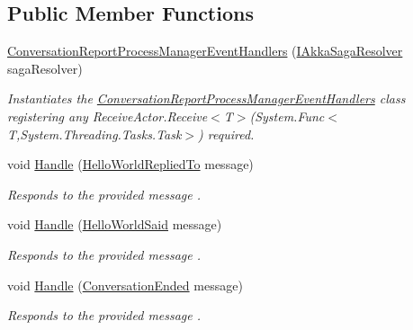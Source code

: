 \subsection*{Public Member Functions}
\begin{DoxyCompactItemize}
\item 
\hyperlink{classCqrs_1_1Akka_1_1Tests_1_1Unit_1_1Sagas_1_1ConversationReportProcessManagerEventHandlers_a0b35d652189d6194ff5893ff114293e0_a0b35d652189d6194ff5893ff114293e0}{Conversation\+Report\+Process\+Manager\+Event\+Handlers} (\hyperlink{interfaceCqrs_1_1Akka_1_1Domain_1_1IAkkaSagaResolver}{I\+Akka\+Saga\+Resolver} saga\+Resolver)
\begin{DoxyCompactList}\small\item\em Instantiates the \hyperlink{classCqrs_1_1Akka_1_1Tests_1_1Unit_1_1Sagas_1_1ConversationReportProcessManagerEventHandlers}{Conversation\+Report\+Process\+Manager\+Event\+Handlers} class registering any Receive\+Actor.\+Receive$<$\+T$>$(\+System.\+Func$<$\+T,\+System.\+Threading.\+Tasks.\+Task$>$) required. \end{DoxyCompactList}\item 
void \hyperlink{classCqrs_1_1Akka_1_1Tests_1_1Unit_1_1Sagas_1_1ConversationReportProcessManagerEventHandlers_a0a40389673be0983b56d65eeaa54bff9_a0a40389673be0983b56d65eeaa54bff9}{Handle} (\hyperlink{classCqrs_1_1Akka_1_1Tests_1_1Unit_1_1Events_1_1HelloWorldRepliedTo}{Hello\+World\+Replied\+To} message)
\begin{DoxyCompactList}\small\item\em Responds to the provided {\itshape message} . \end{DoxyCompactList}\item 
void \hyperlink{classCqrs_1_1Akka_1_1Tests_1_1Unit_1_1Sagas_1_1ConversationReportProcessManagerEventHandlers_a2dab5ed936f713ae25786ab905103f59_a2dab5ed936f713ae25786ab905103f59}{Handle} (\hyperlink{classCqrs_1_1Akka_1_1Tests_1_1Unit_1_1Events_1_1HelloWorldSaid}{Hello\+World\+Said} message)
\begin{DoxyCompactList}\small\item\em Responds to the provided {\itshape message} . \end{DoxyCompactList}\item 
void \hyperlink{classCqrs_1_1Akka_1_1Tests_1_1Unit_1_1Sagas_1_1ConversationReportProcessManagerEventHandlers_a8d31b621db17f2beba78e98a0040f384_a8d31b621db17f2beba78e98a0040f384}{Handle} (\hyperlink{classCqrs_1_1Akka_1_1Tests_1_1Unit_1_1Events_1_1ConversationEnded}{Conversation\+Ended} message)
\begin{DoxyCompactList}\small\item\em Responds to the provided {\itshape message} . \end{DoxyCompactList}\end{DoxyCompactItemize}
